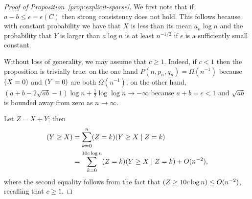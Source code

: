 \documentclass[EJP,final]{ejpecp}
\newcommand{\1}[1]{\mathbbm{1}_{\{#1\}}}
\newcommand{\eps}{\epsilon}
\let\Pr\relax
\DeclareMathOperator{\Pr}{Pr}
\begin{document}
\begin{proof}[Proof of Proposition~\ref{prop:explicit-sparse}]
We first note that if $a - b \leq \epsilon = \epsilon(C)$ then strong consistency does
not hold. This follows because with constant probability we have that $X$
is less than its mean $a_n \log n$ and the probability that $Y$ is larger than
$a \log n$ is at least $n^{-1/2}$ if $\eps$ is a sufficiently small constant.

Without loss of generality, we may assume that $c \ge 1$. Indeed,
if $c < 1$ then the proposition is trivially true:
on the one hand $P(n, p_n, q_n) = \Omega(n^{-1})$
because $\Pr(X = 0)$ and $\Pr(Y = 0)$ are both $\Omega(n^{-1})$;
on the other hand, $(a + b - 2\sqrt{ab} - 1) \log n + \frac 12 \log \log n
\to -\infty$ because $a + b = c < 1$ and $\sqrt{ab}$ is bounded away from zero as $n \to \infty$.

Let $Z = X+Y$; then
\begin{align*}
\Pr(Y \geq X) &= \sum_{k = 0}^n \Pr(Z = k) \Pr(Y \geq X \mid Z = k)\\
&= \sum_{k = 0}^{10 c \log n} \Pr(Z = k) \Pr(Y \geq X \mid Z = k) + O(n^{-2}),
\end{align*}
where the second equality follows from the fact that $\Pr(Z \geq 10 c \log n) \leq O(n^{-2})$,
recalling that $c \geq 1$.


\end{proof}
\end{document}
